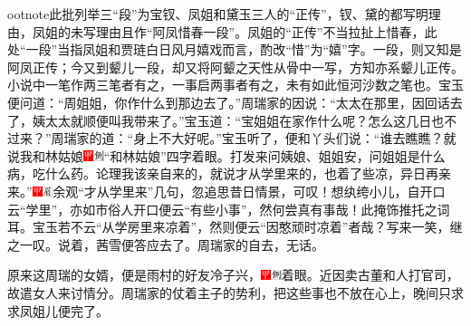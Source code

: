 ootnote{此批列举三“段”为宝钗、凤姐和黛玉三人的“正传”，钗、黛的都写明理由，凤姐的未写理由且作“阿凤惜春一段”。凤姐的“正传”不当拉扯上惜春，此处“一段”当指凤姐和贾琏白日风月嬉戏而言，酌改“惜”为“嬉”字。}{一段，则又知是阿凤正传；今又到颦儿一段，却又将阿颦之天性从骨中一写，方知亦系颦儿正传。小说中一笔作两三笔者有之，一事启两事者有之，未有如此恒河沙数之笔也。}宝玉便问道：“周姐姐，你作什么到那边去了。”周瑞家的因说：“太太在那里，因回话去了，姨太太就顺便叫我带来了。”宝玉道：“宝姐姐在家作什么呢？怎么这几日也不过来？”周瑞家的道：“身上不大好呢。”宝玉听了，便和丫头们说：“谁去瞧瞧？就说我和林姑娘{\includegraphics[width=3mm]{../Images/00002}\includegraphics[width=3mm]{../Images/00011}\footnotesize \kaishu “和林姑娘”四字着眼。}打发来问姨娘、姐姐安，问姐姐是什么病，吃什么药。论理我该亲自来的，就说才从学里来的，也着了些凉，异日再亲来。”{\includegraphics[width=3mm]{../Images/00002}\includegraphics[width=3mm]{../Images/00010}\footnotesize \kaishu 余观“才从学里来”几句，忽追思昔日情景，可叹！想纨绔小儿，自开口云“学里”，亦如市俗人开口便云“有些小事”，然何尝真有事哉！此掩饰推托之词耳。宝玉若不云“从学房里来凉着”，然则便云“因憨顽时凉着”者哉？写来一笑，继之一叹。}说着，茜雪便答应去了。周瑞家的自去，无话。

原来这周瑞的女婿，便是雨村的好友冷子兴，{\includegraphics[width=3mm]{../Images/00002}\includegraphics[width=3mm]{../Images/00011}\footnotesize \kaishu 着眼。}近因卖古董和人打官司，故遣女人来讨情分。周瑞家的仗着主子的势利，把这些事也不放在心上，晚间只求求凤姐儿便完了。

